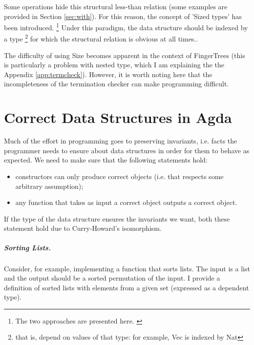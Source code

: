 \documentclass[12pt,twoside,notitlepage]{report}
\begin{document}
Some operations hide this structural less-than relation (some examples are provided in Section \ref{sec:with}). For this reason, the concept of 'Sized types' has been introduced. \footnote{The two approaches are presented here. \cite{termination}} Under this paradigm, the data structure should be indexed by a type \footnote{that is, depend on values of that type: for example, Vec is indexed by Nat} for which the structural relation is obvious at all times.\cite{sizedtypes}. 

The difficulty of using Size becomes apparent in the context of FingerTrees (this is particularly a problem with nested type, which I am explaining the the Appendix \ref{app:termcheck}). However, it is worth noting here that the incompleteness \cite{certified} of the termination checker can make programming difficult.

\section{Correct Data Structures in Agda}

Much of the effort in programming goes to preserving invariants, i.e. facts the programmer needs to ensure about data structures in order for them to behave as expected. 
We need to make sure that the following statements hold:
\begin{itemize}
\item constructors can only produce correct objects (i.e. that respects some arbitrary assumption);
\item any function that takes as input a correct object outputs a correct object.
\end{itemize}

If the type of the data structure ensures the invariants we want, both these statement hold due to Curry-Howard's isomorphism.

\subparagraph{Sorting Lists.}

Consider, for example, implementing a function that sorts lists. The input is a list and the output should be a sorted permutation of the input.
I provide a definition of sorted lists with elements from a given set (expressed as a dependent type).
\end{document}
